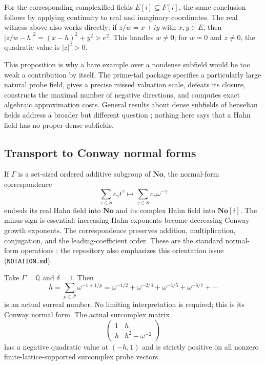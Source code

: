 \documentclass[11pt,oneside]{article}
\theoremstyle{definition}
\theoremstyle{remark}
\newcommand{\Q}{\mathbb Q}
\newcommand{\No}{\mathbf{No}}
\newcommand{\primes}{\mathcal P}
\newcommand{\repo}[1]{\nolinkurl{#1}}%
\begin{document}
For the corresponding complexified fields $E[i]\subseteq F[i]$, the
same conclusion follows by applying continuity to real and imaginary
coordinates. The real witness above also works directly: if
$z/w=x+iy$ with $x,y\in E$, then
$|z/w-h|^2=(x-h)^2+y^2>e^2$. This handles $w\ne0$; for
$w=0$ and $z\ne0$, the quadratic value is $|z|^2>0$.

This proposition is why a bare example over a nondense subfield would
be too weak a contribution by itself. The prime-tail package specifies
a particularly large natural probe field, gives a precise missed
valuation scale, defeats its closure, constructs the maximal number of
negative directions, and computes exact algebraic approximation costs.
General results about dense subfields of henselian fields address a
broader but different question \cite{dense-subfields}; nothing here says
that a Hahn field has no proper dense subfields.

\subsection{Transport to Conway normal forms}

If $\Gamma$ is a set-sized ordered additive subgroup of $\No$, the
normal-form correspondence
\begin{equation}\label{hnd:eq:transport}
 \sum_{\gamma\in S}c_\gamma t^\gamma
 \longmapsto
 \sum_{\gamma\in S}c_\gamma\omega^{-\gamma}
\end{equation}
embeds its real Hahn field into $\No$ and its complex Hahn field into
$\No[i]$. The minus sign is essential: increasing Hahn exponents become
decreasing Conway growth exponents. The correspondence preserves
addition, multiplication, conjugation, and the leading-coefficient
order. These are the standard normal-form operations
\cite{gonshor}; the repository also emphasizes this orientation issue
\cite{repo-map} (\repo{NOTATION.md}).

Take $\Gamma=\Q$ and $\delta=1$. Then
\begin{equation}\label{hnd:eq:surrealtail}
 h=\sum_{p\in\primes}\omega^{-1+1/p}
 =\omega^{-1/2}+\omega^{-2/3}+\omega^{-4/5}
  +\omega^{-6/7}+\cdots
\end{equation}
is an actual surreal number. No limiting interpretation is required;
this is its Conway normal form. The actual surcomplex matrix
\begin{equation}\label{hnd:eq:surrealmatrix}
 \begin{pmatrix}1&h\\h&h^2-\omega^{-2}\end{pmatrix}
\end{equation}
has a negative quadratic value at $(-h,1)$ and is strictly positive on
all nonzero finite-lattice-supported surcomplex probe vectors.
\end{document}
